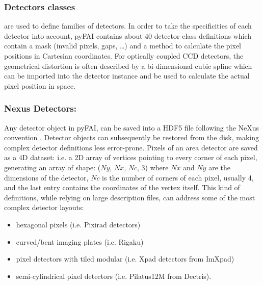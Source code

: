 \documentclass[preprint]{iucr}
\begin{document}
\subsubsection{Detectors classes} are used to define families of detectors.
In order to take the specificities of each detector into account, pyFAI
contains about 40 detector class definitions which contain a mask (invalid pixels,
gaps, \ldots) and a method to calculate the pixel positions in Cartesian
coordinates.
For optically coupled CCD detectors, the geometrical distortion is often
described by a bi-dimensional cubic spline which can be imported into
the detector instance and be used to calculate the actual pixel position in space.

\subsubsection{Nexus Detectors:}
Any detector object in pyFAI, can be saved into a HDF5 file following the NeXus
 convention \cite{nexus}.
Detector objects can subsequently be restored from the disk, making
complex detector definitions less error-prone.
Pixels of an area detector are saved as a 4D dataset: i.e. a 2D
array of vertices pointing to every corner of each pixel, generating
an array of shape: ($Ny$, $Nx$, $Nc$, 3) where $Nx$ and $Ny$ are the dimensions of the
detector, $Nc$ is the number of corners of each pixel, usually 4, and the last
entry contains the coordinates of the vertex itself.
This kind of definitions, while relying on large description files,
can address some of the most complex detector layouts:
\begin{itemize}
  \item hexagonal pixels (i.e. Pixirad detectors)
  \item curved/bent imaging plates (i.e. Rigaku)
  \item pixel detectors with tiled modular  (i.e. Xpad detectors from ImXpad)
  \item semi-cylindrical pixel detectors (i.e. Pilatus12M from Dectris).
\end{itemize}
\end{document}
